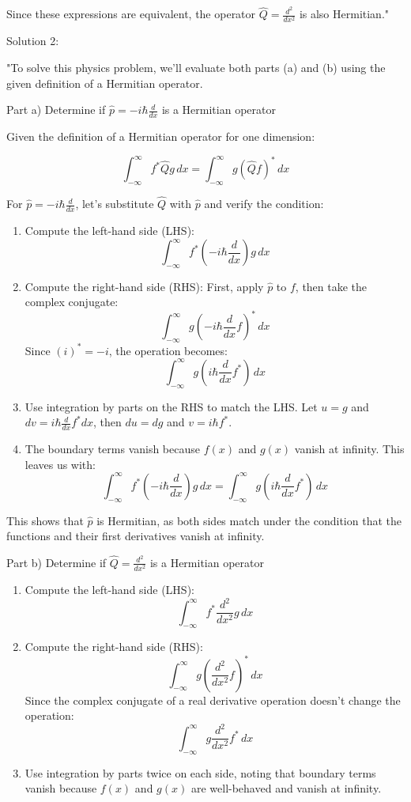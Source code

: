 Since these expressions are equivalent, the operator \( \hat{Q} = \frac{d^{2}}{dx^{2}} \) is also Hermitian."

Solution 2:

"To solve this physics problem, we'll evaluate both parts (a) and (b) using the given definition of a Hermitian operator.

Part a) Determine if \( \hat{p} = -i\hbar\frac{d}{dx} \) is a Hermitian operator

Given the definition of a Hermitian operator for one dimension:

\[ \int_{-\infty}^{\infty} f^{*}\hat{Q}g \, dx = \int_{-\infty}^{\infty} g(\hat{Q}f)^{*} \, dx \]

For \( \hat{p} = -i\hbar\frac{d}{dx} \), let's substitute \( \hat{Q} \) with \( \hat{p} \) and verify the condition:

\begin{enumerate}
    \item Compute the left-hand side (LHS):
    \[ \int_{-\infty}^{\infty} f^{*}(-i\hbar\frac{d}{dx})g \, dx \]
    
    \item Compute the right-hand side (RHS):
    First, apply \( \hat{p} \) to \( f \), then take the complex conjugate:
    \[ \int_{-\infty}^{\infty} g(-i\hbar\frac{d}{dx}f)^{*} \, dx \]
    Since \( (i)^{*} = -i \), the operation becomes:
    \[ \int_{-\infty}^{\infty} g(i\hbar\frac{d}{dx}f^{*}) \, dx \]
    
    \item Use integration by parts on the RHS to match the LHS. Let \( u = g \) and \( dv = i\hbar\frac{d}{dx}f^{*}dx \), then \( du = dg \) and \( v = i\hbar f^{*} \).
    
    \item The boundary terms vanish because \( f(x) \) and \( g(x) \) vanish at infinity. This leaves us with:
    \[ \int_{-\infty}^{\infty} f^{*}(-i\hbar\frac{d}{dx})g \, dx = \int_{-\infty}^{\infty} g(i\hbar\frac{d}{dx}f^{*}) \, dx \]
\end{enumerate}

This shows that \( \hat{p} \) is Hermitian, as both sides match under the condition that the functions and their first derivatives vanish at infinity.

Part b) Determine if \( \hat{Q} = \frac{d^{2}}{dx^{2}} \) is a Hermitian operator

\begin{enumerate}
    \item Compute the left-hand side (LHS):
    \[ \int_{-\infty}^{\infty} f^{*}\frac{d^{2}}{dx^{2}}g \, dx \]
    
    \item Compute the right-hand side (RHS):
    \[ \int_{-\infty}^{\infty} g(\frac{d^{2}}{dx^{2}}f)^{*} \, dx \]
    Since the complex conjugate of a real derivative operation doesn't change the operation:
    \[ \int_{-\infty}^{\infty} g\frac{d^{2}}{dx^{2}}f^{*} \, dx \]
    
    \item Use integration by parts twice on each side, noting that boundary terms vanish because \( f(x) \) and \( g(x) \) are well-behaved and vanish at infinity.
\end{enumerate}

